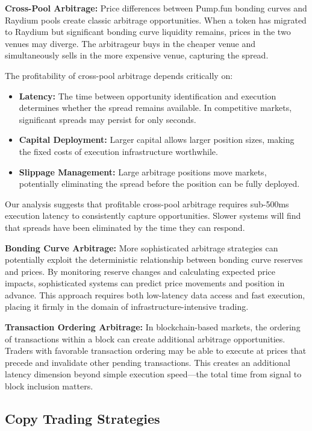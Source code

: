 \documentclass[12pt,a4paper]{article}
\begin{document}
\textbf{Cross-Pool Arbitrage:} Price differences between Pump.fun bonding curves and Raydium pools create classic arbitrage opportunities. When a token has migrated to Raydium but significant bonding curve liquidity remains, prices in the two venues may diverge. The arbitrageur buys in the cheaper venue and simultaneously sells in the more expensive venue, capturing the spread.

The profitability of cross-pool arbitrage depends critically on:

\begin{itemize}
\item \textbf{Latency:} The time between opportunity identification and execution determines whether the spread remains available. In competitive markets, significant spreads may persist for only seconds.
\item \textbf{Capital Deployment:} Larger capital allows larger position sizes, making the fixed costs of execution infrastructure worthwhile.
\item \textbf{Slippage Management:} Large arbitrage positions move markets, potentially eliminating the spread before the position can be fully deployed.
\end{itemize}

Our analysis suggests that profitable cross-pool arbitrage requires sub-500ms execution latency to consistently capture opportunities. Slower systems will find that spreads have been eliminated by the time they can respond.

\textbf{Bonding Curve Arbitrage:} More sophisticated arbitrage strategies can potentially exploit the deterministic relationship between bonding curve reserves and prices. By monitoring reserve changes and calculating expected price impacts, sophisticated systems can predict price movements and position in advance. This approach requires both low-latency data access and fast execution, placing it firmly in the domain of infrastructure-intensive trading.

\textbf{Transaction Ordering Arbitrage:} In blockchain-based markets, the ordering of transactions within a block can create additional arbitrage opportunities. Traders with favorable transaction ordering may be able to execute at prices that precede and invalidate other pending transactions. This creates an additional latency dimension beyond simple execution speed—the total time from signal to block inclusion matters.

\subsection{Copy Trading Strategies}
\end{document}
